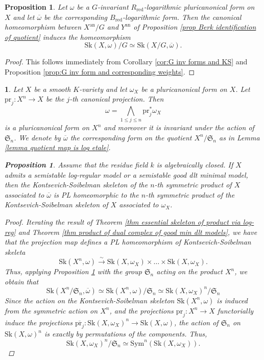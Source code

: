 \documentclass{amsart}%
\numberwithin{equation}{subsection}
\theoremstyle{plain2}
\newtheorem{prop}[equation]{Proposition}
\theoremstyle{definition2}
\theoremstyle{stepstyle}
\theoremstyle{point}
\theoremstyle{subpoint}
\newtheorem{subpoint}[equation]{}%
\newcommand{\spa}[1]{\begin{subpoint}#1\end{subpoint}}           %
\newcommand{\redu}{\mathrm{red}}
\newcommand{\pr}{\mathrm{pr}}
\newcommand{\an}{\mathrm{an}}
\newcommand{\Sk}{\mathrm{Sk}}
\begin{document}
\begin{prop} \label{prop:G inv and homeo KS of quotient}
Let $\omega$ be a $G$-invariant $R_\redu$-logarithmic pluricanonical form on $X$ and let $\overline{\omega}$ be the corresponding $B_\redu$-logarithmic form. Then the canonical homeomorphism between $X^\an/G$ and $Y^\an$ of Proposition \ref{prop Berk identification of quotient} induces the homeomorphism $$\Sk(X,\omega)/G \simeq \Sk(X/G,\overline{\omega}).$$
\end{prop}
\begin{proof}
This follows immediately from Corollary \ref{cor:G inv forms and KS} and Proposition \ref{prop:G inv form and corresponding weights}.
\end{proof}

\spa{Let $X$ be a smooth $K$-variety and let $\omega_X$ be a pluricanonical form on $X$. Let $\pr_j:X^n \rightarrow X$ be the $j$-th canonical projection. Then $$\omega= \bigwedge_{1\leqslant j \leqslant n} \pr_j^*\omega_X$$ is a pluricanonical form on $X^n$ and moreover it is invariant under the action of $\mathfrak{S}_n$. We denote by $\overline{\omega}$ the corresponding form on the quotient $X^n/\mathfrak{S}_n$ as in Lemma \ref{lemma quotient map is log etale}.
\begin{prop}  \label{prop semistability and KS symm quotient}
Assume that the residue field $k$ is algebraically closed.  If $X$ admits a semistable log-regular model or a semistable good dlt minimal model, then the Kontsevich-Soibelman skeleton of the $n$-th symmetric product of $X$ associated to $\overline{\omega}$ is PL homeomorphic to the $n$-th symmetric product of the Kontsevich-Soibelman skeleton of $X$ associated to $\omega_X$.
\end{prop}
\begin{proof}
Iterating the result of Theorem \ref{thm essential skeleton of product via log-reg} and Theorem \ref{thm product of dual complex of good min dlt models}, we have that the projection map defines a PL homeomorphism of Kontsevich-Soibelman skeleta $$\Sk(X^n, \omega) \xrightarrow{\sim} \Sk(X,\omega_X) \times  \ldots \times \Sk(X,\omega_X).$$ Thus, applying Proposition \ref{prop:G inv and homeo KS of quotient} with the group $\mathfrak{S}_n$ acting on the product $X^n$, we obtain that $$\Sk(X^n/\mathfrak{S}_n, \overline{\omega}) \simeq \Sk(X^n,\omega)/\mathfrak{S}_n \simeq  \Sk(X,\omega_X)^n/ \mathfrak{S}_n$$
Since the action on the Kontsevich-Soibelman skeleton $\Sk(X^n,\omega)$ is induced from the symmetric action on $X^n$, and the projections $\pr_j:X^n \rightarrow X$ functorially induce the projections $\overline{\pr_j}: \Sk(X,\omega_X)^n \rightarrow \Sk(X,\omega)$, the action of $\mathfrak{S}_n$ on $\Sk(X,\omega)^n$ is exactly by permutations of the components. Thus, $$ \Sk(X,\omega_X)^n/ \mathfrak{S}_n \simeq \text{Sym}^n(\Sk(X,\omega_X)).$$
\end{proof}
}
\end{document}
